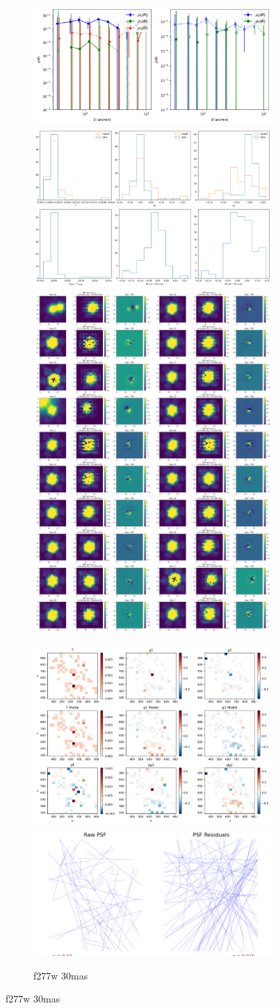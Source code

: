 \documentclass[a4 paper]{article}
\numberwithin{equation}{section}
\newcommand{\0}{\mathbf{0}}
\begin{document}
\begin{figure}[!h]
  \begin{subfigure}{\linewidth}
  \includegraphics[width=.3\linewidth]{277.30/piff_rho.png}\hfill
  \includegraphics[width=.3\linewidth]{277.30/piff_shapes.png}\hfill
  \includegraphics[width=.3\linewidth]{277.30/piff_stars.png}
  \end{subfigure}\par\medskip
  \begin{subfigure}{\linewidth}
  \includegraphics[width=.3\linewidth]{277.30/piff_twod.png}\hfill
  \includegraphics[width=.3\linewidth]{277.30/piff_whisker.png}\hfill
  \caption{f277w 30mas}
  \end{subfigure}\par\medskip


\end{figure}
\end{document}
